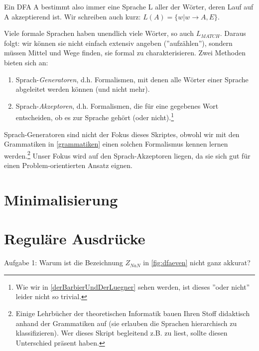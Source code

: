 Ein DFA A bestimmt also immer eine Sprache L aller der Wörter,
deren Lauf auf A akzeptierend ist.
Wir schreiben auch kurz: $L(A) = \{w|w \rightarrow A,E\}$.


Viele formale Sprachen haben unendlich viele Wörter,
so auch $L_{MATCH}$.
Daraus folgt: wir können sie nicht einfach extensiv angeben (''aufzählen''),
sondern müssen Mittel und Wege finden, sie formal zu charakterisieren.
Zwei Methoden bieten sich an:
\begin{enumerate}
    \item Sprach-\emph{Generatoren}, d.h. Formalismen,
        mit denen alle Wörter einer Sprache abgeleitet werden können
        (und nicht mehr).
    \item Sprach-\emph{Akzeptoren}, d.h. Formalismen,
        die für eine gegebenes Wort entscheiden,
        ob es zur Sprache gehört (oder nicht).\footnote{
            Wie wir in \autoref{derBarbierUndDerLuegner} sehen werden,
            ist dieses ''oder nicht'' leider nicht so trivial.}
\end{enumerate}

Sprach-Generatoren sind nicht der Fokus dieses Skriptes, obwohl wir mit den Grammatiken
in \autoref{grammatiken} einen solchen Formalismus kennen lernen werden.\footnote{
Einige Lehrbücher der theoretischen Informatik bauen Ihren Stoff didaktisch anhand der Grammatiken
auf (sie erlauben die Sprachen hierarchisch zu klassifizieren).
Wer dieses Skript begleitend z.B. zu \cite{schoening} liest,
sollte diesen Unterschied präsent haben.}
Unser Fokus wird auf den Sprach-Akzeptoren liegen,
da sie sich gut für einen Problem-orientierten Ansatz eignen.


\section{Minimalisierung}
\section{Reguläre Ausdrücke}

Aufgabe 1: Warum ist die Bezeichnung $Z_{NaN}$ in \autoref{fig:dfaeven} nicht ganz akkurat?
